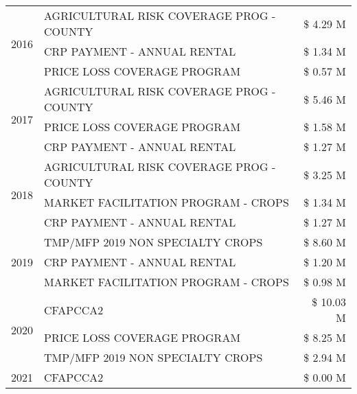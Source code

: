 \begin{tabular}{llr}
\multirow[t]{3}{*}{2016} & AGRICULTURAL RISK COVERAGE PROG - COUNTY & \$ 4.29 M \\
 & CRP PAYMENT - ANNUAL RENTAL & \$ 1.34 M \\
 & PRICE LOSS COVERAGE PROGRAM & \$ 0.57 M \\
\cline{1-3}
\multirow[t]{3}{*}{2017} & AGRICULTURAL RISK COVERAGE PROG - COUNTY & \$ 5.46 M \\
 & PRICE LOSS COVERAGE PROGRAM & \$ 1.58 M \\
 & CRP PAYMENT - ANNUAL RENTAL & \$ 1.27 M \\
\cline{1-3}
\multirow[t]{3}{*}{2018} & AGRICULTURAL RISK COVERAGE PROG - COUNTY & \$ 3.25 M \\
 & MARKET FACILITATION PROGRAM - CROPS & \$ 1.34 M \\
 & CRP PAYMENT - ANNUAL RENTAL & \$ 1.27 M \\
\cline{1-3}
\multirow[t]{3}{*}{2019} & TMP/MFP 2019 NON SPECIALTY CROPS & \$ 8.60 M \\
 & CRP PAYMENT - ANNUAL RENTAL & \$ 1.20 M \\
 & MARKET FACILITATION PROGRAM - CROPS & \$ 0.98 M \\
\cline{1-3}
\multirow[t]{3}{*}{2020} & CFAPCCA2 & \$ 10.03 M \\
 & PRICE LOSS COVERAGE PROGRAM & \$ 8.25 M \\
 & TMP/MFP 2019 NON SPECIALTY CROPS & \$ 2.94 M \\
\cline{1-3}
2021 & CFAPCCA2 & \$ 0.00 M \\
\cline{1-3}
\bottomrule
\end{tabular}
